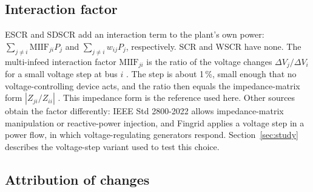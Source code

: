 \begin{table}[!t]
\caption{Metric definitions and conventions}
\label{tab:conventions}
\centering
\footnotesize

\end{table}

\subsection{Interaction factor}

ESCR and SDSCR add an interaction term to the plant's own power: $\sum_{j\ne i}
\mathrm{MIIF}_{ji}P_j$ and $\sum_{j\ne i} w_{ij}P_j$, respectively. SCR and WSCR have none. The
multi-infeed interaction factor $\mathrm{MIIF}_{ji}$ is the ratio of the voltage changes
$\Delta V_j/\Delta V_i$ for a small voltage step at bus $i$ \cite{cigre364}. The step is about
1\,\%, small enough that no voltage-controlling device acts, and the ratio then equals the
impedance-matrix form $|Z_{ji}/Z_{ii}|$ \cite{cigre364}. This impedance form is the reference used
here. Other sources obtain the factor differently: IEEE Std 2800-2022 \cite{ieee2800} allows impedance-matrix
manipulation or reactive-power injection, and Fingrid \cite{fingrid2023} applies a voltage step in a power
flow, in which voltage-regulating generators respond. Section~\ref{sec:study} describes the
voltage-step variant used to test this choice.

\subsection{Attribution of changes}

